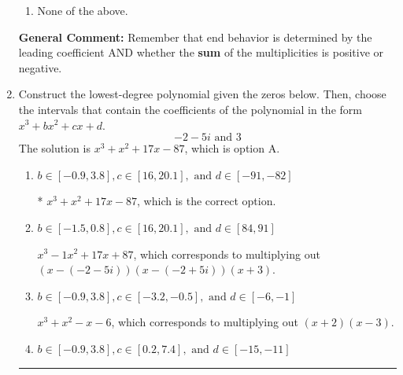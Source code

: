 \documentclass{extbook}[14pt]
\newcommand{\litem}[1]{\item #1

\rule{\textwidth}{0.4pt}}
\begin{document}
\begin{enumerate}
{\begin{enumerate}[label=\Alph*.]
\item None of the above.\end{enumerate}
\textbf{General Comment:} Remember that end behavior is determined by the leading coefficient AND whether the \textbf{sum} of the multiplicities is positive or negative.
}
\litem{
Construct the lowest-degree polynomial given the zeros below. Then, choose the intervals that contain the coefficients of the polynomial in the form $x^3+bx^2+cx+d$.
\[ -2 - 5 i \text{ and } 3 \]The solution is \( x^{3} + x^{2} +17 x -87 \), which is option A.\begin{enumerate}[label=\Alph*.]
\item \( b \in [-0.9, 3.8], c \in [16, 20.1], \text{ and } d \in [-91, -82] \)

* $x^{3} + x^{2} +17 x -87$, which is the correct option.
\item \( b \in [-1.5, 0.8], c \in [16, 20.1], \text{ and } d \in [84, 91] \)

$x^{3} -1 x^{2} +17 x + 87$, which corresponds to multiplying out $(x-(-2 - 5 i))(x-(-2 + 5 i))(x + 3)$.
\item \( b \in [-0.9, 3.8], c \in [-3.2, -0.5], \text{ and } d \in [-6, -1] \)

$x^{3} + x^{2} -x -6$, which corresponds to multiplying out $(x + 2)(x -3)$.
\item \( b \in [-0.9, 3.8], c \in [0.2, 7.4], \text{ and } d \in [-15, -11] \)


\end{enumerate}}
\end{enumerate}
\end{document}
